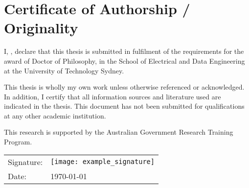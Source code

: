 \chapter*{Certificate of Authorship / Originality}

\makeatletter

I, \@author{}, declare that this thesis is submitted in fulfilment of the requirements for the award of Doctor of Philosophy, in the School of Electrical and Data Engineering at the University of Technology Sydney.
\makeatother

\vspace{6pt}

\noindent This thesis is wholly my own work unless otherwise referenced or acknowledged. In addition, I certify that all information sources and literature used are indicated in the thesis. This document has not been submitted for qualifications at any other academic institution.



\vspace{6pt}

\noindent This research is supported by the Australian Government Research Training Program.


\vspace{1cm}

\begin{tabular}{m{3cm}m{7cm}}
Signature: &\texttt{[image: example\_signature]}\\

Date:	&\today\\
\end{tabular}
\vspace{6pt}

\makeatletter


\makeatother

